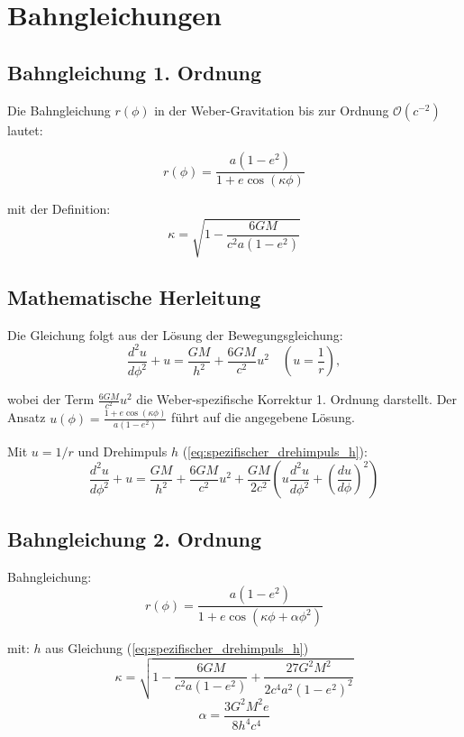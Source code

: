 \section{Bahngleichungen}
\subsection{Bahngleichung 1. Ordnung}
Die Bahngleichung \(r(\phi)\) in der Weber-Gravitation bis zur Ordnung \(\mathcal{O}(c^{-2})\) lautet:

\begin{equation}
\label{eq:bahngleichung_1_ordnung}
\boxed
{
    r(\phi) = \frac{a(1 - e^2)}{1 + e \cos\left(\kappa\phi\right)}
}
\end{equation}

\noindent mit der Definition:
\begin{equation}
\label{eq:kappa_1_ordnung}
\boxed
{
    \kappa = \sqrt{1 - \frac{6GM}{c^2a(1 - e^2)}}    
}
\end{equation}

\subsection*{Mathematische Herleitung}
Die Gleichung folgt aus der Lösung der Bewegungsgleichung:
\[
\frac{d^2u}{d\phi^2} + u = \frac{GM}{h^2} + \frac{6GM}{c^2} u^2 \quad \left(u = \frac{1}{r}\right),
\]

wobei der Term \(\frac{6GM}{c^2} u^2\) die Weber-spezifische Korrektur 1. Ordnung darstellt. Der Ansatz \(u(\phi) = \frac{1 + e \cos(\kappa\phi)}{a(1 - e^2)}\) führt auf die angegebene Lösung.

Mit $u=1/r$ und Drehimpuls $h$ (\ref{eq:spezifischer_drehimpuls_h}):
\[
\frac{d^2u}{d\phi^2} + u = \frac{GM}{h^2} + \frac{6GM}{c^2}u^2 + \frac{GM}{2c^2}\left(u\frac{d^2u}{d\phi^2} + \left(\frac{du}{d\phi}\right)^2\right)
\]

\subsection{Bahngleichung 2. Ordnung}
Bahngleichung:
\begin{equation}
\label{eq:bahngleichung_2_ordnung}
    \boxed
    {
        r(\phi) = \frac{a(1-e^2)}{1 + e\cos\left(\kappa\phi + \alpha\phi^2\right)}
    }
\end{equation}

mit:
$h$ aus Gleichung (\ref{eq:spezifischer_drehimpuls_h})
\begin{equation}
\label{eq:kappa_2_ordnung}
\boxed
{
    \kappa = \sqrt{1 - \frac{6GM}{c^2a(1-e^2)} + \frac{27G^2M^2}{2c^4a^2(1-e^2)^2}}
}
\end{equation}
\begin{equation}
\label{eq:alpha}
\boxed
{
    \alpha = \frac{3G^2M^2e}{8h^4c^4}    
}
\end{equation}

